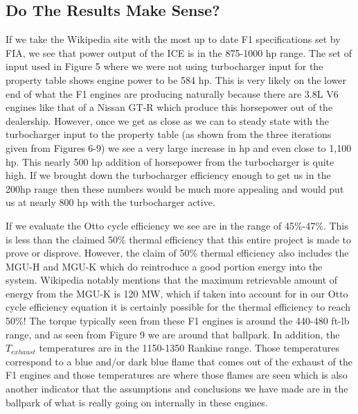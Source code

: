 \documentclass{article}
\begin{document}
\subsection{Do The Results Make Sense?}
If we take the Wikipedia site with the most up to date F1 specifications\cite{F1History} set by FIA, we see that power output of the ICE is in the 875-1000 hp range. The set of input used in Figure 5 where we were not using turbocharger input for the property table shows engine power to be 584 hp. This is very likely on the lower end of what the F1 engines are producing naturally because there are 3.8L V6 engines like that of a Nissan GT-R which produce this horsepower out of the dealership. However, once we get as close as we can to steady state with the turbocharger input to the property table (as shown from the three iterations given from Figures 6-9) we see a very large increase in hp and even close to 1,100 hp. This nearly 500 hp addition of horsepower from the turbocharger is quite high. If we brought down the turbocharger efficiency enough to get us in the 200hp range then these numbers would be much more appealing and would put us at nearly 800 hp with the turbocharger active. \par
If we evaluate the Otto cycle efficiency we see are in the range of 45\%-47\%. This is less than the claimed 50\% thermal efficiency that this entire project is made to prove or disprove. However, the claim of 50\% thermal efficiency also includes the MGU-H and MGU-K which do reintroduce a good portion energy into the system. Wikipedia notably mentions that the maximum retrievable amount of energy from the MGU-K is 120 MW, which if taken into account for in our Otto cycle efficiency equation it is certainly possible for the thermal efficiency to reach 50\%! The torque typically seen from these F1 engines is around the 440-480 ft-lb range, and as seen from Figure 9 we are around that ballpark. In addition, the $T_{exhaust}$ temperatures are in the 1150-1350 Rankine range. Those temperatures correspond to a blue and/or dark blue flame that comes out of the exhaust of the F1 engines and those temperatures are where those flames are seen which is also another indicator that the assumptions and conclusions we have made are in the ballpark of what is really going on internally in these engines. 
\end{document}
